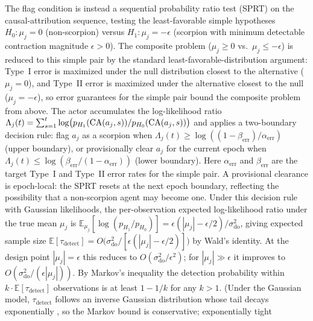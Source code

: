 \begin{proposition}
\begin{enumerate}
    The flag condition is instead a sequential probability ratio test
    (SPRT) \citep{wald1945sequential} on the causal-attribution
    sequence, testing the least-favorable simple hypotheses
    $H_0: \mu_j = 0$ (non-scorpion) versus
    $H_1: \mu_j = -\epsilon$ (scorpion with minimum detectable
    contraction magnitude $\epsilon > 0$). The composite problem
    ($\mu_j \geq 0$ vs.\ $\mu_j \leq -\epsilon$) is reduced to
    this simple pair by the standard least-favorable-distribution
    argument: Type~I error is maximized under the null distribution
    closest to the alternative ($\mu_j = 0$), and Type~II error is
    maximized under the alternative closest to the null
    ($\mu_j = -\epsilon$), so error guarantees for the simple pair
    bound the composite problem from above.
    The actor accumulates the
    log-likelihood ratio
    $\Lambda_j(t) = \sum_{s=1}^{t} \log\bigl(p_{H_1}(\mathrm{CA}(a_j,
    s)) / p_{H_0}(\mathrm{CA}(a_j, s))\bigr)$ and applies a
    two-boundary decision rule: flag $a_j$ as a scorpion when
    $\Lambda_j(t) \geq \log((1 - \beta_{\mathrm{err}}) /
    \alpha_{\mathrm{err}})$ (upper boundary), or provisionally clear
    $a_j$ for the current epoch when
    $\Lambda_j(t) \leq \log(\beta_{\mathrm{err}} /
    (1 - \alpha_{\mathrm{err}}))$ (lower boundary). Here
    $\alpha_{\mathrm{err}}$ and $\beta_{\mathrm{err}}$ are the target
    Type~I and Type~II error rates for the simple pair. A provisional
    clearance is epoch-local: the SPRT resets at the next epoch
    boundary, reflecting the possibility that a non-scorpion agent
    may become one. Under this decision rule with
    Gaussian likelihoods, the per-observation expected
    log-likelihood ratio under the true mean $\mu_j$ is
    $\mathbb{E}_{\mu_j}[\log(p_{H_1}/p_{H_0})] =
    \epsilon(|\mu_j| - \epsilon/2) / \sigma_{\mathrm{do}}^2$,
    giving expected sample size
    $\mathbb{E}[\tau_{\mathrm{detect}}] =
    O\bigl(\sigma_{\mathrm{do}}^2 /
    [\epsilon(|\mu_j| - \epsilon/2)]\bigr)$
    by Wald's identity. At the design point $|\mu_j| = \epsilon$
    this reduces to $O(\sigma_{\mathrm{do}}^2 / \epsilon^2)$; for
    $|\mu_j| \gg \epsilon$ it improves to
    $O(\sigma_{\mathrm{do}}^2 / (\epsilon |\mu_j|))$.
    By Markov's inequality the detection probability within
    $k \cdot \mathbb{E}[\tau_{\mathrm{detect}}]$ observations is at
    least $1 - 1/k$ for any $k > 1$. (Under the Gaussian model,
    $\tau_{\mathrm{detect}}$ follows an inverse Gaussian distribution
    whose tail decays exponentially \citep{wald1945sequential}, so
    the Markov bound is conservative; exponentially tight

\end{enumerate}
\end{proposition}

